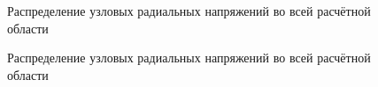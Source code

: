 \documentclass[a4paper]{article}
\begin{document}
\begin{figure}[h]
\caption{Распределение узловых радиальных напряжений во всей расчётной области}
\label{fig:task_03_basic_pressure_distribution_r}
\end{figure}

\newpage

\begin{figure}[h]
\caption{Распределение узловых радиальных напряжений во всей расчётной области}
\label{fig:task_03_basic_pressure_distribution_phi}
\end{figure}
\end{document}
